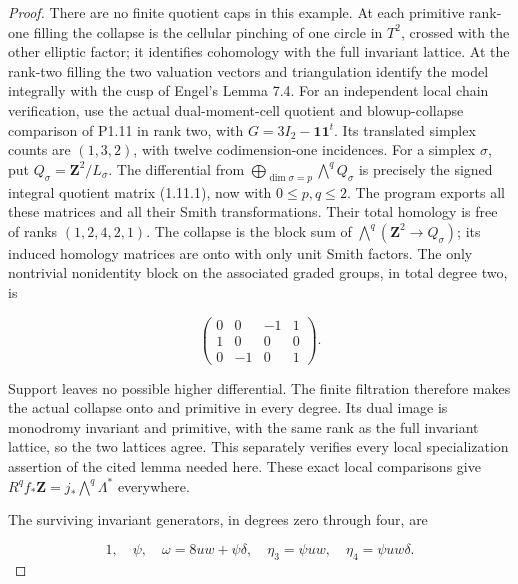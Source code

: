 \begin{proof}
There are no finite quotient caps in this example.  At each
primitive rank-one filling the collapse is the cellular pinching
of one circle in \(T^2\), crossed with the other elliptic factor;
it identifies cohomology with the full invariant lattice.  At
the rank-two filling the two valuation vectors and triangulation
identify the model integrally with the cusp of Engel's Lemma 7.4.
For an independent local chain verification, use the actual
dual-moment-cell quotient and blowup-collapse comparison of P1.11
in rank two, with \(G=3I_2-\mathbf1\mathbf1^t\).  Its translated
simplex counts are \((1,3,2)\), with twelve codimension-one
incidences.  For a simplex \(\sigma\), put
\(Q_\sigma=\mathbf Z^2/L_\sigma\).  The differential from
\(\bigoplus_{\dim\sigma=p}\bigwedge^q Q_\sigma\) is precisely
the signed integral quotient matrix (1.11.1), now with
\(0\leq p,q\leq2\).  The program
 exports all these matrices
and all their Smith transformations.  Their total homology is
free of ranks \((1,2,4,2,1)\).  The collapse is the block sum
of \(\bigwedge^q(\mathbf Z^2\to Q_\sigma)\); its induced
homology matrices are onto with only unit Smith factors.  The
only nontrivial nonidentity block on the associated graded groups,
in total degree two, is

\[
 \begin{pmatrix}0&0&-1&1\\1&0&0&0\\0&-1&0&1\end{pmatrix}.
\]

Support leaves no possible higher differential.  The finite
filtration therefore makes the actual collapse onto and primitive
in every degree.  Its dual image is monodromy invariant and
primitive, with the same rank as the full invariant lattice, so
the two lattices agree.  This separately verifies every local
specialization assertion of the cited lemma needed here.
These exact local comparisons
give \(R^qf_*\mathbf Z=j_*\bigwedge^q\Lambda^*\) everywhere.

The surviving invariant generators, in degrees zero through four,
are

\[
 1,\quad\psi,\quad\omega=8uw+\psi\delta,
 \quad\eta_3=\psi uw,\quad\eta_4=\psi uw\delta.
\]


\end{proof}
